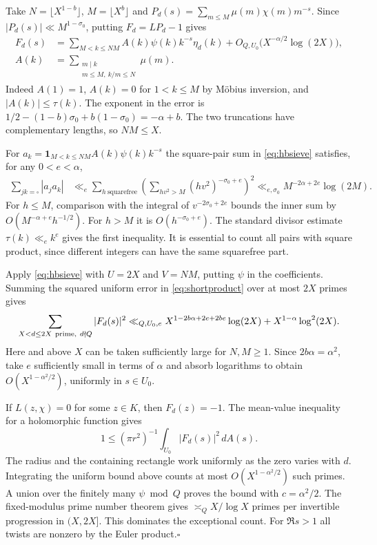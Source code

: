 Take $N=\lfloor X^{1-b}\rfloor$, $M=\lfloor X^b\rfloor$ and $P_d(s)=\sum_{m\le M}\mu(m)\chi(m)m^{-s}$. Since $|P_d(s)|\ll M^{1-\sigma_0}$, putting $F_d=LP_d-1$ gives
\begin{align}
 F_d(s)&=\sum_{M<k\le NM} A(k)\psi(k)k^{-s}\eta_d(k)
                 +O_{Q,U_0}\big(X^{-\alpha/2}\log(2X)\big),\label{eq:shortproduct}\\
 A(k)&=\sum_{\substack{m\mid k\\m\le M,\ k/m\le N}}\mu(m).\nonumber
\end{align}
Indeed $A(1)=1$, $A(k)=0$ for $1<k\le M$ by M\"obius inversion, and $|A(k)|\le\tau(k)$. The exponent in the error is $1/2-(1-b)\sigma_0+b(1-\sigma_0)=-\alpha+b$. The two truncations have complementary lengths, so $NM\le X$.

For $a_k=\mathbf 1_{M<k\le NM}A(k)\psi(k)k^{-s}$ the square-pair sum in \eqref{eq:hbsieve} satisfies, for any $0<e<\alpha$,
\begin{align*}
 \sum_{jk=\square}|a_j a_k|
 &\ll_e\sum_{h\ \mathrm{squarefree}}
   \left(\sum_{h v^2>M}(h v^2)^{-\sigma_0+e}\right)^2
 \ll_{e,\sigma_0} M^{-2\alpha+2e}\log(2M).
\end{align*}
For $h\le M$, comparison with the integral of $v^{-2\sigma_0+2e}$ bounds the inner sum by $O(M^{-\alpha+e}h^{-1/2})$. For $h>M$ it is $O(h^{-\sigma_0+e})$. The standard divisor estimate $\tau(k)\ll_e k^e$ gives the first inequality. It is essential to count all pairs with square product, since different integers can have the same squarefree part.

Apply \eqref{eq:hbsieve} with $U=2X$ and $V=NM$, putting $\psi$ in the coefficients. Summing the squared uniform error in \eqref{eq:shortproduct} over at most $2X$ primes gives
\[
 \sum_{X<d\le2X\ {\rm prime},\ d\nmid Q}|F_d(s)|^2
  \ll_{Q,U_0,e} X^{1-2b\alpha+2e+2be}\log(2X)
                +X^{1-\alpha}\log^2(2X).
\]
Here and above $X$ can be taken sufficiently large for $N,M\ge1$. Since $2b\alpha=\alpha^2$, take $e$ sufficiently small in terms of $\alpha$ and absorb logarithms to obtain $O(X^{1-\alpha^2/2})$, uniformly in $s\in U_0$.

If $L(z,\chi)=0$ for some $z\in K$, then $F_d(z)=-1$. The mean-value inequality for a holomorphic function gives
\[
 1\le (\pi r^2)^{-1}\int_{U_0}|F_d(s)|^2\,dA(s).
\]
The radius and the containing rectangle work uniformly as the zero varies with $d$. Integrating the uniform bound above counts at most $O(X^{1-\alpha^2/2})$ such primes. A union over the finitely many $\psi\bmod Q$ proves the bound with $c=\alpha^2/2$. The fixed-modulus prime number theorem gives $\asymp_Q X/\log X$ primes per invertible progression in $(X,2X]$. This dominates the exceptional count. For $\Re s>1$ all twists are nonzero by the Euler product.\hfill$\square$

